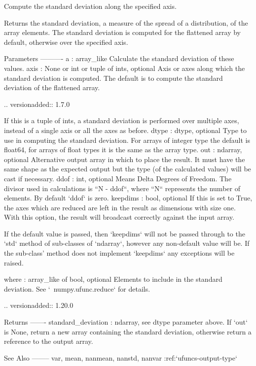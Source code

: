 \begin{DoxyVerb}Compute the standard deviation along the specified axis.

Returns the standard deviation, a measure of the spread of a distribution,
of the array elements. The standard deviation is computed for the
flattened array by default, otherwise over the specified axis.

Parameters
----------
a : array_like
    Calculate the standard deviation of these values.
axis : None or int or tuple of ints, optional
    Axis or axes along which the standard deviation is computed. The
    default is to compute the standard deviation of the flattened array.

    .. versionadded:: 1.7.0

    If this is a tuple of ints, a standard deviation is performed over
    multiple axes, instead of a single axis or all the axes as before.
dtype : dtype, optional
    Type to use in computing the standard deviation. For arrays of
    integer type the default is float64, for arrays of float types it is
    the same as the array type.
out : ndarray, optional
    Alternative output array in which to place the result. It must have
    the same shape as the expected output but the type (of the calculated
    values) will be cast if necessary.
ddof : int, optional
    Means Delta Degrees of Freedom.  The divisor used in calculations
    is ``N - ddof``, where ``N`` represents the number of elements.
    By default `ddof` is zero.
keepdims : bool, optional
    If this is set to True, the axes which are reduced are left
    in the result as dimensions with size one. With this option,
    the result will broadcast correctly against the input array.

    If the default value is passed, then `keepdims` will not be
    passed through to the `std` method of sub-classes of
    `ndarray`, however any non-default value will be.  If the
    sub-class' method does not implement `keepdims` any
    exceptions will be raised.

where : array_like of bool, optional
    Elements to include in the standard deviation.
    See `~numpy.ufunc.reduce` for details.

    .. versionadded:: 1.20.0

Returns
-------
standard_deviation : ndarray, see dtype parameter above.
    If `out` is None, return a new array containing the standard deviation,
    otherwise return a reference to the output array.

See Also
--------
var, mean, nanmean, nanstd, nanvar
:ref:`ufuncs-output-type`


\end{DoxyVerb}
